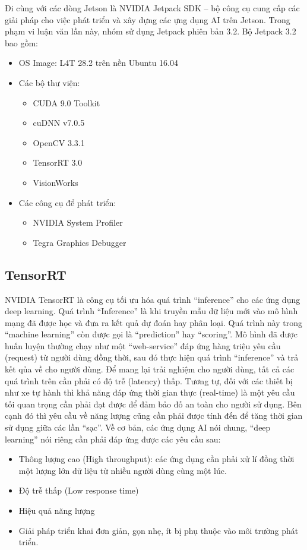 \documentclass[a4paper]{report}
\begin{document}
Đi cùng với các dòng Jetson là NVIDIA Jetpack SDK – bộ công cụ cung cấp các giải pháp cho việc phát triển và xây dựng các ựng dụng AI trên Jetson. Trong phạm vi luận văn lần này, nhóm sử dụng Jetpack phiên bản 3.2. Bộ Jetpack 3.2 bao gồm:
\begin{itemize}
\item OS Image: L4T 28.2 trên nền Ubuntu 16.04
\item Các bộ thư viện:
\begin{itemize}
	\item CUDA 9.0 Toolkit
	\item 	cuDNN v7.0.5
	\item 	OpenCV 3.3.1
	\item 	TensorRT 3.0
	\item 	VisionWorks
\end{itemize}
\item Các công cụ để phát triển:
\begin{itemize}
	\item  NVIDIA System Profiler
	\item  Tegra Graphics Debugger
\end{itemize}
\end{itemize}

\subsection{TensorRT}
NVIDIA TensorRT là công cụ tối ưu hóa quá trình “inference” cho các ứng dụng deep learning. Quá trình “Inference” là khi truyền mẫu dữ liệu mới vào mô hình mạng đã được học và đưa ra kết quả dự đoán hay phân loại. Quá trình này trong “machine learning” còn được gọi là “prediction” hay “scoring”. Mô hình đã được huấn luyện thường chạy như một “web-service” đáp ứng hàng triệu yêu cầu (request) từ người dùng đồng thời, sau đó thực hiện quá trình “inference” và trả kết qủa về cho người dùng. Để mang lại trải nghiệm cho người dùng, tất cả các quá trình trên cần phải có độ trễ (latency) thấp. Tương tự, đối với các thiết bị như xe tự hành thì khả năng đáp ứng thời gian thực (real-time) là một yêu cầu tối quan trọng cần phải đạt được để đảm bảo đố an toàn cho người sử dụng. Bên cạnh đó thì yêu cầu về năng lượng cũng cần phải được tính đến để tăng thời gian sử dụng giữa các lần “sạc”.
Về cơ bản, các ứng dụng AI nói chung, “deep learning” nói riêng cần phải đáp ứng được các yêu cầu sau:
\begin{itemize}
	\item Thông lượng cao (High throughput): các ứng dụng cần phải xử lí đồng thời một lượng lớn dữ liệu từ nhiều người dùng cùng một lúc.
	\item Độ trễ thấp (Low response time)
	\item Hiệu quả năng lượng
	\item Giải pháp triển khai đơn giản, gọn nhẹ, ít bị phụ thuộc vào môi trường phát triển.
\end{itemize}
\end{document}
